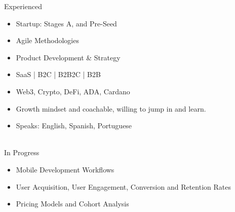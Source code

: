 %
Experienced
  \begin{itemize}
    \setlength\itemsep{-0.3em}
\item Startup: Stages A, and Pre-Seed
\item Agile Methodologies
\item Product Development \& Strategy
\item SaaS | B2C | B2B2C | B2B
\item Web3, Crypto, DeFi, ADA, Cardano
\item Growth mindset and coachable, willing to jump in and learn.
\item Speaks: English, Spanish, Portuguese
    \end{itemize}
\\
%
In Progress %
  \begin{itemize}
    \setlength\itemsep{-0.3em}
\item Mobile Development Workflows
\item User Acquisition, User Engagement, %
Conversion and Retention Rates %
\item Pricing Models and Cohort Analysis
\end{itemize}


